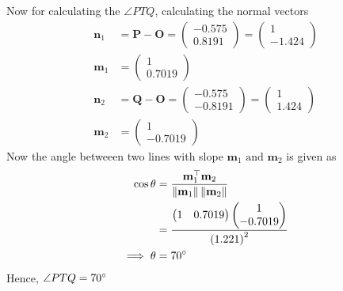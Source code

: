 \documentclass[12pt]{article}
\providecommand{\brak}[1]{\ensuremath{\left(#1\right)}}
\providecommand{\norm}[1]{\left\lVert#1\right\rVert}
\newcommand{\myvec}[1]{\ensuremath{\begin{pmatrix}#1\end{pmatrix}}}
\let\vec\mathbf
\begin{document}
Now for calculating the $\angle{PTQ}$, calculating the normal vectors
\begin{align}
	\vec{n}_1 &= \vec{P}-\vec{O} = \myvec{-0.575\\0.8191} = \myvec{1\\-1.424}\\
	\vec{m}_1 &= \myvec{1\\0.7019}\\
	\vec{n}_2 &= \vec{Q}-\vec{O} = \myvec{-0.575\\-0.8191} = \myvec{1\\1.424}\\
	\vec{m}_2 &= \myvec{1\\-0.7019}
\end{align}
Now the angle betweeen two lines with slope $\vec{m}_1 \text{ and } \vec{m}_2$ is given as
\begin{align}
	\cos\theta &= \frac{\vec{m}_1 ^\top \vec{m}_2}{\norm{\vec{m}_1}\norm{\vec{m}_2}}\\
	&=\frac{\myvec{1&0.7019}\myvec{1\\-0.7019}}{\brak{1.221}^2}\\
	\implies \theta &= 70\degree
\end{align}
Hence, $\angle{PTQ} = 70\degree$
\end{document}
